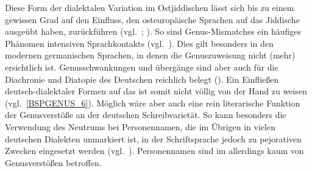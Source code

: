  
  Diese Form der dialektalen Variation im Ostjiddischen lässt sich bis zu einem gewissen Grad auf den Einfluss, den osteuropäische Sprachen auf das Jiddische ausgeübt haben, zurückführen (vgl.\, \citealt{Trudgill1999}; \citealt[591]{Weinreich1973}). 
So sind Genus-Mismatches ein häufiges Phänomen intensiven Sprachkontakts (vgl.\, \citealt{Trudgill1999}). Dies gilt besonders in den modernen germanischen Sprachen, in denen die Genuszuweisung nicht (mehr) ersichtlich ist. Genusschwankungen und übergänge sind aber auch für die Diachronie und Diatopie des Deutschen reichlich belegt (\citealt[443f]{Schirmunski1962}). Ein Einfließen deutsch-dialektaler Formen auf das  ist somit nicht völlig von der Hand zu weisen (vgl.\, \ref{BSPGENUS_6}). Möglich wäre aber auch eine rein literarische Funktion der Genusverstöße an der deutschen Schreibvarietät. So kann besonders die Verwendung des Neutrums bei Personennamen, die im Übrigen in vielen deutschen Dialekten  unmarkiert ist, in der Schriftsprache jedoch zu pejorativen Zwecken eingesetzt werden (vgl.\, \citealt{NueblingimErsch}). 
Personennamen sind im \hai{{\LiJi}} allerdings kaum von Genusverstößen betroffen. 

